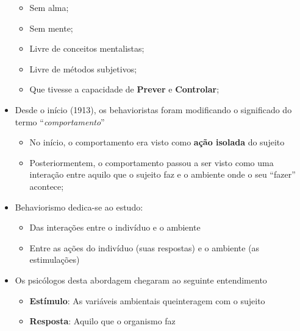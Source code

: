 \documentclass[
]{book}
\providecommand{\tightlist}{%
  \setlength{\itemsep}{0pt}\setlength{\parskip}{0pt}}
\begin{document}
\begin{itemize}
  \begin{itemize}
  \tightlist
  \item
    Sem alma;
  \item
    Sem mente;
  \item
    Livre de conceitos mentalistas;
  \item
    Livre de métodos subjetivos;
  \item
    Que tivesse a capacidade de \textbf{Prever} e \textbf{Controlar};
  \end{itemize}
\item
  Desde o início (1913), os behavioristas foram modificando o significado do termo ``\emph{comportamento}''

  \begin{itemize}
  \tightlist
  \item
    No início, o comportamento era visto como \textbf{ação isolada} do sujeito
  \item
    Posteriormentem, o comportamento passou a ser visto como uma interação entre aquilo que o sujeito faz e o ambiente onde o seu ``fazer'' acontece;
  \end{itemize}
\item
  Behaviorismo dedica-se ao estudo:

  \begin{itemize}
  \tightlist
  \item
    Das interações entre o indivíduo e o ambiente
  \item
    Entre as ações do indivíduo (suas respostas) e o ambiente (as estimulações)
  \end{itemize}
\item
  Os psicólogos desta abordagem chegaram ao seguinte entendimento

  \begin{itemize}
  \tightlist
  \item
    \textbf{Estímulo}: As variáveis ambientais queinteragem com o sujeito
  \item
    \textbf{Resposta}: Aquilo que o organismo faz
  \end{itemize}
\end{itemize}
\end{document}
